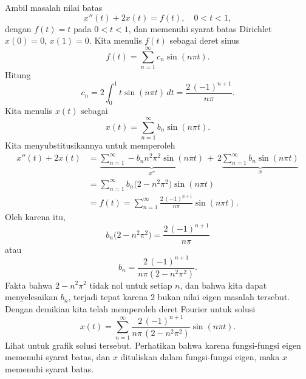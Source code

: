 \begin{example}
Ambil masalah nilai batas
\begin{equation*}
x''(t) + 2 x(t) = f(t) ,
\quad
0 < t < 1,
\end{equation*}
dengan $f(t) = t$ pada $0 < t < 1$, dan 
memenuhi syarat batas Dirichlet
$x(0) = 0$, $x(1)=0$.
Kita menulis $f(t)$ sebagai deret sinus
\begin{equation*}
f(t) = \sum_{n=1}^\infty c_n \sin (n \pi t) .
\end{equation*}
Hitung
\begin{equation*}
c_n = 2 \int_0^1 t \sin (n \pi t) \,dt = \frac{2 \, {(-1)}^{n+1}}{n \pi} .
\end{equation*}
Kita menulis $x(t)$ sebagai
\begin{equation*}
x(t) = \sum_{n=1}^\infty b_n \sin (n \pi t) .
\end{equation*}
Kita menyubstitusikannya untuk memperoleh 
\begin{equation*}
\begin{split}
x''(t) + 2 x(t) & =
\underbrace{
\sum_{n=1}^\infty - b_n n^2 \pi^2 \sin (n \pi t)
}_{x''}
\,
+
\,
2
\underbrace{
\sum_{n=1}^\infty b_n \sin (n \pi t)
}_{x}
\\
& =
\sum_{n=1}^\infty b_n \bigl(2 - n^2 \pi^2 \bigr) \sin (n \pi t)
\\
& = f(t)
=
\sum_{n=1}^\infty  \frac{2\, {(-1)}^{n+1}}{n \pi} \sin (n \pi t) .
\end{split}
\end{equation*}
Oleh karena itu,
\begin{equation*}
b_n \bigl(2 - n^2 \pi^2\bigr)
=
\frac{2\,{(-1)}^{n+1}}{n \pi}
\end{equation*}
atau
\begin{equation*}
b_n
=
\frac{2\,{(-1)}^{n+1}}{n \pi (2 - n^2 \pi^2)} .
\end{equation*}
Fakta bahwa $2-n^2\pi^2$ tidak nol untuk setiap $n$, dan bahwa kita dapat
menyelesaikan $b_n$, terjadi tepat karena
$2$ bukan nilai eigen masalah tersebut.
Dengan demikian kita telah memperoleh deret Fourier untuk solusi
\begin{equation*}
x(t) = 
\sum_{n=1}^\infty
\frac{2\,{(-1)}^{n+1}}{n \pi \,(2 - n^2 \pi^2)}
\sin (n \pi t) .
\end{equation*}
Lihat  untuk grafik solusi tersebut.
Perhatikan bahwa karena fungsi-fungsi eigen memenuhi syarat batas, 
dan $x$ dituliskan dalam fungsi-fungsi eigen, maka $x$
memenuhi syarat batas.
\begin{myfig}
\capstart
{}
\caption{Grafik solusi dari $x''+2x=t$, $x(0)=0$, $x(1)=0$.%
\label{bnd-dirich-graph:fig}}
\end{myfig}
\end{example}

